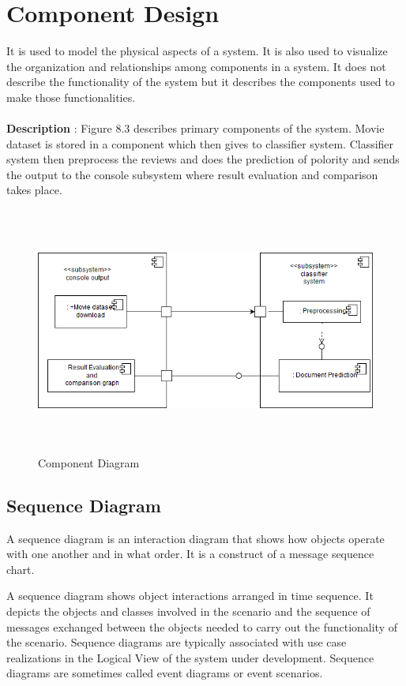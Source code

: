 \documentclass[oneside,a4paper,12pt]{pictreport}
\begin{document}
\section{Component Design}
It is used to model the physical aspects of a system. It is also used to visualize the organization and relationships among components in a system. It does not describe the functionality of the system but it describes the components used to make those functionalities.\\\\
\textbf{Description} : Figure 8.3 describes primary components of the system.
Movie dataset is stored in a component which then gives to classifier system.
Classifier system then preprocess the reviews and does the prediction of polority and sends the output
to the console subsystem where result evaluation and comparison takes place.
\begin{figure}[h!]
\includegraphics[width=5.2in,height=3.2in]{Component_.png}
\caption{Component Diagram}
\end{figure}

\newpage

\subsection{Sequence Diagram}
A sequence diagram is an interaction diagram that shows how objects operate
with one another and in what order. It is a construct of a message sequence chart.

A sequence diagram shows object interactions arranged in time sequence. 
It depicts the objects and classes involved in the scenario and the sequence
of messages exchanged between the objects needed to carry out the functionality 
of the scenario. Sequence diagrams are typically associated with use case 
realizations in the Logical View of the system under development. 
Sequence diagrams are sometimes called event diagrams or event scenarios.
\end{document}
